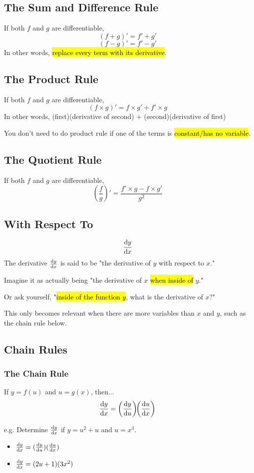 \documentclass[a4paper,12pt]{article}
\begin{document}
\subsection{The Sum and Difference Rule}
If both $f$ and $g$ are differentiable,
$$(f+g)' = f' + g'$$
$$(f-g)' = f' - g'$$
In other words, \hl{replace every term with its derivative}.

\subsection{The Product Rule}
If both $f$ and $g$ are differentiable,
$$(f \times g)' = f \times g' + f' \times g$$
In other words, (first)(derivative of second) $+$ (second)(derivative of first)

You don't need to do product rule if one of the terms is \hl{constant/has no variable}.

\subsection{The Quotient Rule}
If both $f$ and $g$ are differentiable,
$$\left( \frac{f}{g} \right)' = \frac{f' \times g - f \times g'}{g^2}$$

\subsection{With Respect To}
$$\dv{y}{x}$$
The derivative $\dv{y}{x}$ is said to be "the derivative of $y$ with respect to $x$."

Imagine it as actually being "the derivative of $x$ \hl{when inside of} $y$."

Or ask yourself, "\hl{inside of the function $y$}, what is the derivative of $x$?"

This only becomes relevant when there are more variables than $x$ and $y$, such as the chain rule below.

\subsection{Chain Rules}
\subsubsection{The Chain Rule}
If $y = f(u)$ and $u = g(x)$, then...
$$\dv{y}{x} = \left(\dv{y}{u}\right)\!\!\left(\dv{u}{x}\right)$$

e.g. Determine $\dv{y}{x}$ if $y = u^2 + u$ and $u = x^3$.
\begin{itemize}
    \item{$\dv{y}{x} = (\dv{y}{u})(\dv{u}{x})$}
    \item{$\dv{y}{x} = (2u + 1)(3x^2)$}
\end{itemize}
\end{document}
